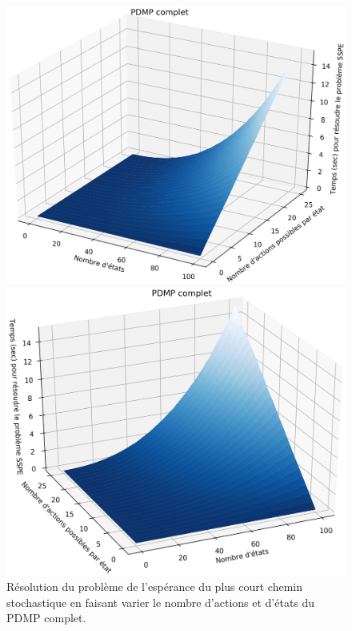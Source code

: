\documentclass[12pt,a4paper]{report}
\theoremstyle{definition}%
\theoremstyle{remark}
\begin{document}
\begin{figure}[H]
	\centering
	\captionsetup{justification=centering}
	\begin{minipage}[b]{0.45\textwidth}
		\includegraphics[scale=0.4]{figures/sspe1.png}
	\end{minipage}
	\hspace{0.05\textwidth}
	\begin{minipage}[b]{0.45\textwidth}
		\includegraphics[scale=0.4]{figures/sspe2.png}
	\end{minipage}
	\caption{\footnotesize Résolution du problème de l'espérance du plus court chemin stochastique en faisant varier le nombre d'actions et d'états du PDMP complet.}
		\label{graphic1}
\end{figure}
\end{document}
